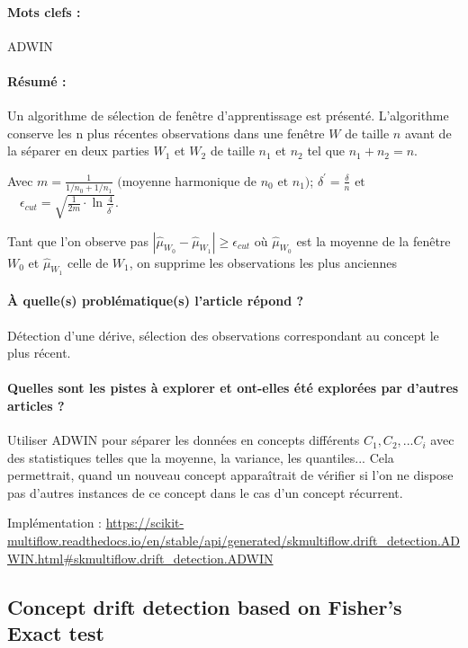 \documentclass[11pt,a4paper]{report}
\begin{document}
\paragraph{Mots clefs :} ADWIN

\paragraph{Résumé :} Un algorithme de sélection de fenêtre d’apprentissage est présenté. L’algorithme conserve les n plus récentes observations dans une fenêtre $W$ de taille $n$ avant de la séparer en deux parties $W_1$ et $W_2$ de taille $n_1$ et $n_2$ tel que $n_1+n_2=n$. 

Avec $m=\frac{1}{1 / n_{0}+1 / n_{1}} \text { (moyenne harmonique de } n_{0} \text { et } n_{1} )  $; $\delta^{\prime}=\frac{\delta}{n} \text{ et } $ $ \quad \epsilon_{c u t}=\sqrt{\frac{1}{2 m} \cdot \ln \frac{4}{\delta^{\prime}}}$. 

Tant que l'on observe pas $\left|\hat{\mu}_{W_{0}}-\hat{\mu}_{W_{1}}\right| \geq \epsilon_{c u t}$ où $\hat{\mu}_{W_{0}}$ est la moyenne de la fenêtre $W_0$ et $\hat{\mu}_{W_{1}}$ celle de $W_1$, on supprime les observations les plus anciennes

\paragraph{À quelle(s) problématique(s) l'article répond ?} Détection d'une dérive, sélection des observations correspondant au concept le plus récent.

\paragraph{Quelles sont les pistes à explorer et ont-elles  été explorées par d'autres articles ?} Utiliser ADWIN pour séparer les données en concepts différents $C_1, C_2, ... C_i$ avec des statistiques telles que la moyenne, la variance, les quantiles... Cela permettrait, quand un nouveau concept apparaîtrait de vérifier si l'on ne dispose pas d'autres instances de ce concept dans le cas d'un concept récurrent.

Implémentation : \url{https://scikit-multiflow.readthedocs.io/en/stable/api/generated/skmultiflow.drift_detection.ADWIN.html#skmultiflow.drift_detection.ADWIN}


\subsection{Concept drift detection based on Fisher’s Exact test}
\end{document}
